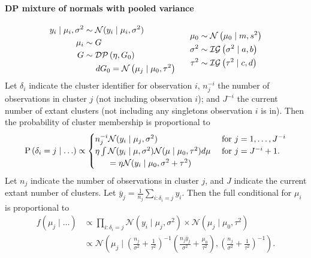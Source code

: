 \documentclass[12pt]{article}
\begin{document}
\paragraph{DP mixture of normals with pooled variance}
\begin{equation}
    \begin{aligned}
        y_i\mid\mu_i,\sigma^2 &\sim \mathcal{N}(y_i\mid\mu_i,\sigma^2)\\
        \mu_i &\sim G\\
        G &\sim \mathcal{DP}\left(\eta,G_0\right)\\
        &\hspace{0.5cm}dG_0 = \mathcal{N}\left(\mu_j\mid\mu_0,\tau^2\right)
    \end{aligned}
    ~\hspace{0.5cm}
    \begin{aligned}
        \mu_0 &\sim \mathcal{N}\left(\mu_0\mid m,s^2\right)\\
        \sigma^2 &\sim \mathcal{IG}\left(\sigma^2\mid a, b\right)\\
        \tau^2 &\sim \mathcal{IG}\left(\tau^2\mid c,d\right)
    \end{aligned}
\end{equation}
Let $\delta_i$ indicate the cluster identifier for observation $i$, $n_j^{-i}$ the number of observations in cluster $j$ (not including observation $i$); and $J^{-i}$ the current number of extant clusters (not including any singletons observation $i$ is in).  Then the probability of cluster membership is proportional to
\begin{equation}
    \text{P}\left(\delta_i = j\mid\ldots\right) \propto \begin{cases}
        n_j^{-i}\mathcal{N}(y_i\mid\mu_j,\sigma^2) &\text{~for }j = 1,\ldots,J^{-i}\\
        \eta\int\mathcal{N}(y_i\mid\mu,\sigma^2)\mathcal{N}(\mu\mid\mu_0,\tau^2)d\mu &\text{~for }j = J^{-i} + 1.\\
        ~\hspace{0.5cm}= \eta\mathcal{N}(y_i\mid\mu_0,\sigma^2 + \tau^2)
        \end{cases}
\end{equation}
Let $n_j$ indicate the number of observations in cluster $j$, and $J$ indicate the current extant number of clusters.  Let $\bar{y}_j = \frac{1}{n_j}\sum_{i:\delta_i = j}y_i$.  Then the full conditional for $\mu_i$ is proportional to
\begin{equation*}
    \begin{aligned}
        f(\mu_j\mid\ldots) &\propto \prod_{i:\delta_i = j}\mathcal{N}\left(y_i\mid\mu_j,\sigma^2\right)\times \mathcal{N}\left(\mu_j\mid\mu_0,\tau^2\right)\\
        &\propto \mathcal{N}\left(\mu_j\mid\left(\frac{n_j}{\sigma^2} + \frac{1}{\tau^2}\right)^{-1}\left(\frac{n_j\bar{y}_j}{\sigma^2} + \frac{\mu_0}{\tau^2}\right), \left(\frac{n_j}{\sigma^2} + \frac{1}{\tau^2}\right)^{-1}\right).
    \end{aligned}
\end{equation*}
\end{document}
